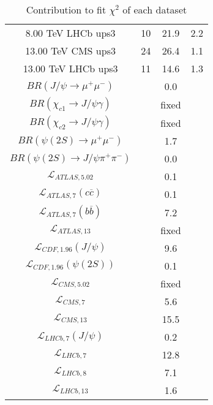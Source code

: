 \begin{table}[h!]
\begin{tabular}{c|c|c|c}
8.00 TeV LHCb ups3 & 10 & 21.9 & 2.2 \\
13.00 TeV CMS ups3 & 24 & 26.4 & 1.1 \\
13.00 TeV LHCb ups3 & 11 & 14.6 & 1.3 \\
\hline
$BR(J/\psi\rightarrow\mu^+\mu^-)$ &  & 0.0 &  \\
$BR(\chi_{c1}\rightarrow J/\psi\gamma)$ &  & fixed & \\
$BR(\chi_{c2}\rightarrow J/\psi\gamma)$ &  & fixed & \\
$BR(\psi(2S)\rightarrow\mu^+\mu^-)$ &  & 1.7 &  \\
$BR(\psi(2S)\rightarrow J/\psi\pi^+\pi^-)$ &  & 0.0 &  \\
$\mathcal L_{ATLAS,5.02}$ &  & 0.1 &  \\
$\mathcal L_{ATLAS,7}(c\overline c)$ &  & 0.1 &  \\
$\mathcal L_{ATLAS,7}(b\overline b)$ &  & 7.2 &  \\
$\mathcal L_{ATLAS,13}$ &  & fixed & \\
$\mathcal L_{CDF,1.96}(J/\psi)$ &  & 9.6 &  \\
$\mathcal L_{CDF,1.96}(\psi(2S))$ &  & 0.1 &  \\
$\mathcal L_{CMS,5.02}$ &  & fixed & \\
$\mathcal L_{CMS,7}$ &  & 5.6 &  \\
$\mathcal L_{CMS,13}$ &  & 15.5 &  \\
$\mathcal L_{LHCb,7}(J/\psi)$ &  & 0.2 &  \\
$\mathcal L_{LHCb,7}$ &  & 12.8 &  \\
$\mathcal L_{LHCb,8}$ &  & 7.1 &  \\
$\mathcal L_{LHCb,13}$ &  & 1.6 &  \\
\end{tabular}
\caption{Contribution to fit $\chi^2$ of each dataset}
\end{table}
